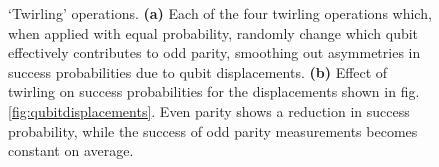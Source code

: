 \begin{figure}
	\centering
	\hspace{0.05\columnwidth}
	\caption{`Twirling' operations. \textbf{(a)} Each of the four twirling operations which, when applied with equal probability, randomly change which qubit effectively contributes to odd parity, smoothing out asymmetries in success probabilities due to qubit displacements. \textbf{(b)} Effect of twirling on success probabilities for the displacements shown in fig.\@ \ref{fig:qubitdisplacements}. Even parity shows a reduction in success probability, while the success of odd parity measurements becomes constant on average.}
\end{figure}